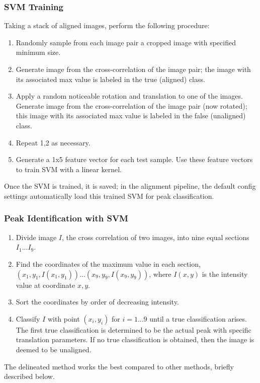 \documentclass{article}
\begin{document}
\subsubsection{SVM Training}
Taking a stack of aligned images, perform the following procedure:
\begin{enumerate}
\item Randomly sample from each image pair a cropped image with specified minimum size.
\item Generate image from the cross-correlation of the image pair; the image with its associated max value is labeled in the true (aligned) class.
\item Apply a random noticeable rotation and translation to one of the images. Generate image from the cross-correlation of the image pair (now rotated); this image with its associated max value is labeled in the false (unaligned) class. 
\item Repeat 1,2 as necessary.
\item Generate a 1x5 feature vector for each test sample. Use these feature vectors to train SVM with a linear kernel. 
\end{enumerate}
Once the SVM is trained, it is saved; in the alignment pipeline, the default config settings automatically load this trained SVM for peak classification.

\subsubsection{Peak Identification with SVM}
\begin{enumerate}
\item Divide image $I$, the cross correlation of two images, into nine equal sections $I_1...I_9$.
\item Find the coordinates of the maximum value in each section, $(x_1,y_1, I(x_1,y_1))...(x_9,y_9, I(x_9,y_9))$, where $I(x,y)$ is the intensity value at coordinate $x,y$. 
\item Sort the coordinates by order of decreasing intensity.
\item Classify $I$ with point $(x_i, y_i)$ for $i=1...9$ until a true classification arises.
The first true classification is determined to be the actual peak with specific translation parameters. If no true classification is obtained, then the image is deemed to be unaligned. 
\end{enumerate}
The delineated method works the best compared to other methods, briefly described below.\\
\end{document}
